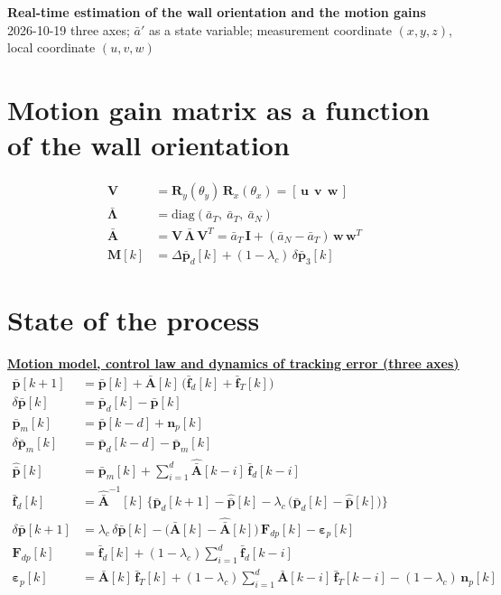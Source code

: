 \documentclass[11pt,a4paper]{ctexart}
\newcommand{\hd}[1]{\par\bigskip\noindent\underline{\textbf{#1}}}
\newcommand{\lc}{\lambda_c}
\newcommand{\bp}{\bar{\mathbf p}}
\newcommand{\dpb}{\delta\bar{\mathbf p}}
\newcommand{\Ab}{\bar{\mathbf A}}
\newcommand{\Ah}{\hat{\bar{\mathbf A}}}
\newcommand{\uu}{\mathbf u}
\newcommand{\vv}{\mathbf v}
\newcommand{\ww}{\mathbf w}
\newcommand{\aT}{\bar a_T}
\newcommand{\aN}{\bar a_N}
\newcommand{\Fd}{\mathbf F_{dp}}
\newcommand{\Mb}{\mathbf M}
\newcommand{\epp}{\boldsymbol\varepsilon_p}
\newcommand{\I}{\mathbf I}
\newcommand{\V}{\mathbf V}
\newcommand{\Lb}{\bar{\boldsymbol\Lambda}}
\begin{document}
\begin{center}\textbf{\large Real-time estimation of the wall orientation and the motion gains}\\[2pt]
\small 2026-10-19 \quad three axes; $\bar a'$ as a state variable; measurement coordinate $(x, y, z)$, local coordinate $(u, v, w)$\end{center}

\section{Motion gain matrix as a function of the wall orientation}
\begin{align*}
\V &= \mathbf R_y(\theta_y)\,\mathbf R_x(\theta_x) = [\,\uu\ \ \vv\ \ \ww\,] \\
\Lb &= \mathrm{diag}(\aT,\ \aT,\ \aN) \\
\Ab &= \V\,\Lb\,\V^{T} = \aT\,\I + (\aN - \aT)\,\ww\,\ww^{T} \\
\Mb[k] &= \Delta\bp_d[k] + (1-\lc)\,\dpb_3[k]
\end{align*}

\section{State of the process}
\hd{Motion model, control law and dynamics of tracking error (three axes)}
\begin{align*}
\bp[k+1] &= \bp[k] + \Ab[k]\,\big(\bar{\mathbf f}_d[k] + \bar{\mathbf f}_T[k]\big) \\
\dpb[k] &= \bp_d[k] - \bp[k] \\
\bp_m[k] &= \bp[k-d] + \mathbf n_p[k] \\
\dpb_m[k] &= \bp_d[k-d] - \bp_m[k] \\
\hat{\bp}[k] &= \bp_m[k] + \sum_{i=1}^{d} \Ah[k-i]\,\bar{\mathbf f}_d[k-i] \\
\bar{\mathbf f}_d[k] &= \Ah^{-1}[k]\,\Big\{\bp_d[k+1] - \hat{\bp}[k] - \lc\,\big(\bp_d[k] - \hat{\bp}[k]\big)\Big\} \\
\dpb[k+1] &= \lc\,\dpb[k] - \big(\Ab[k] - \Ah[k]\big)\,\Fd[k] - \epp[k] \\
\Fd[k] &= \bar{\mathbf f}_d[k] + (1-\lc)\sum_{i=1}^{d} \bar{\mathbf f}_d[k-i] \\
\epp[k] &= \Ab[k]\,\bar{\mathbf f}_T[k] + (1-\lc)\sum_{i=1}^{d} \Ab[k-i]\,\bar{\mathbf f}_T[k-i] - (1-\lc)\,\mathbf n_p[k]
\end{align*}
\end{document}
